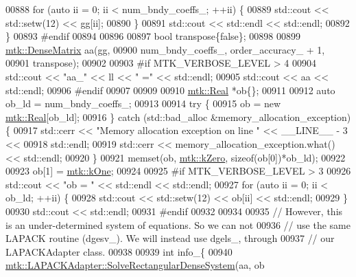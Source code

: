 \begin{DoxyCode}
{{00888       \textcolor{keywordflow}{for} (\textcolor{keyword}{auto} ii = 0; ii < num\_bndy\_coeffs\_; ++ii) \{
00889         std::cout << std::setw(12) << gg[ii];
00890       \}
00891       std::cout << std::endl << std::endl;
00892     \}
00893 \textcolor{preprocessor}{    #endif}
00894 
00896 
00897     \textcolor{keywordtype}{bool} transpose\{\textcolor{keyword}{false}\};
00898 
00899     \hyperlink{classmtk_1_1DenseMatrix}{mtk::DenseMatrix} aa(gg,
00900                          num\_bndy\_coeffs\_, order\_accuracy\_ + 1,
00901                          transpose);
00902 
00903 \textcolor{preprocessor}{    #if MTK\_VERBOSE\_LEVEL > 4}
00904     std::cout << \textcolor{stringliteral}{"aa\_"} << ll << \textcolor{stringliteral}{" ="} << std::endl;
00905     std::cout << aa << std::endl;
00906 \textcolor{preprocessor}{    #endif}
00907 
00909 
00910     \hyperlink{group__c01-roots_gac080bbbf5cbb5502c9f00405f894857d}{mtk::Real} *ob\{\};
00911 
00912     \textcolor{keyword}{auto} ob\_ld = num\_bndy\_coeffs\_;
00913 
00914     \textcolor{keywordflow}{try} \{
00915       ob = \textcolor{keyword}{new} \hyperlink{group__c01-roots_gac080bbbf5cbb5502c9f00405f894857d}{mtk::Real}[ob\_ld];
00916     \} \textcolor{keywordflow}{catch} (std::bad\_alloc &memory\_allocation\_exception) \{
00917       std::cerr << \textcolor{stringliteral}{"Memory allocation exception on line "} << \_\_LINE\_\_ - 3 <<
00918         std::endl;
00919       std::cerr << memory\_allocation\_exception.what() << std::endl;
00920     \}
00921     memset(ob, \hyperlink{group__c01-roots_ga59a451a5fae30d59649bcda274fea271}{mtk::kZero}, \textcolor{keyword}{sizeof}(ob[0])*ob\_ld);
00922 
00923     ob[1] = \hyperlink{group__c01-roots_ga26407c24d43b6b95480943340d285c71}{mtk::kOne};
00924 
00925 \textcolor{preprocessor}{    #if MTK\_VERBOSE\_LEVEL > 3}
00926     std::cout << \textcolor{stringliteral}{"ob = "} << std::endl << std::endl;
00927     \textcolor{keywordflow}{for} (\textcolor{keyword}{auto} ii = 0; ii < ob\_ld; ++ii) \{
00928       std::cout << std::setw(12) << ob[ii] << std::endl;
00929     \}
00930     std::cout << std::endl;
00931 \textcolor{preprocessor}{    #endif}
00932 
00934 
00935     \textcolor{comment}{// However, this is an under-determined system of equations. So we can not}
00936     \textcolor{comment}{// use the same LAPACK routine (dgesv\_). We will instead use dgels\_, through}
00937     \textcolor{comment}{// our LAPACKAdapter class.}
00938 
00939     \textcolor{keywordtype}{int} info\_\{
00940       \hyperlink{classmtk_1_1LAPACKAdapter_a380f148ffdf96bae2f79ae28f1a6560c}{mtk::LAPACKAdapter::SolveRectangularDenseSystem}(aa, ob
}}
\end{DoxyCode}
